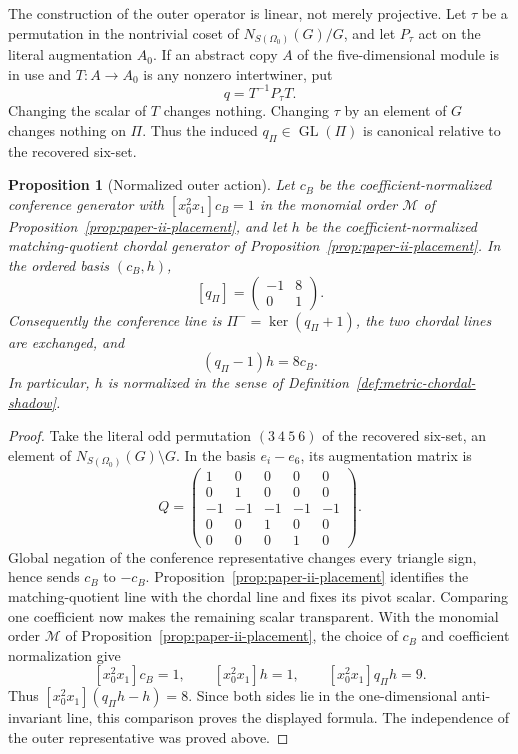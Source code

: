 \documentclass[11pt]{article}
\newtheorem{proposition}[theorem]{Proposition}
\theoremstyle{definition}
\theoremstyle{remark}
\begin{document}
The construction of the outer operator is linear, not merely projective.
Let \(\tau\) be a permutation in the nontrivial coset of
\(N_{S(\Omega_0)}(G)/G\), and let \(P_\tau\) act on the literal augmentation
\(A_0\).  If an abstract copy \(A\) of the five-dimensional module is in use
and \(T:A\to A_0\) is any nonzero intertwiner, put
\[
                         q=T^{-1}P_\tau T.
\]
Changing the scalar of \(T\) changes nothing.  Changing \(\tau\) by an
element of \(G\) changes nothing on \(\Pi\).  Thus the induced
\(q_\Pi\in\operatorname{GL}(\Pi)\) is canonical relative to the recovered
six-set.

\begin{proposition}[Normalized outer action]
\label{prop:outer-pencil-action}
Let \(c_B\) be the coefficient-normalized conference generator with
\([x_0^2x_1]c_B=1\) in the monomial order \(\mathcal M\) of
Proposition~\ref{prop:paper-ii-placement}, and let
\(h\) be the coefficient-normalized matching-quotient chordal generator of
Proposition~\ref{prop:paper-ii-placement}.  In the
ordered basis \((c_B,h)\),
\[
              [q_\Pi]=\begin{pmatrix}-1&8\\0&1\end{pmatrix}.
\]
Consequently the conference line is \(\Pi^-=\ker(q_\Pi+1)\), the two chordal
lines are exchanged, and
\[
          (q_\Pi-1)h=8c_B.
\]
In particular, \(h\) is normalized in the sense of
Definition~\ref{def:metric-chordal-shadow}.
\end{proposition}

\begin{proof}
Take the literal odd permutation \((3\ 4\ 5\ 6)\) of the recovered
six-set, an element of \(N_{S(\Omega_0)}(G)\setminus G\).  In the basis \(e_i-e_6\), its augmentation matrix is
\[
 Q=\begin{pmatrix}
 1&0&0&0&0\\
 0&1&0&0&0\\
 -1&-1&-1&-1&-1\\
 0&0&1&0&0\\
 0&0&0&1&0
 \end{pmatrix}.
\]
Global negation of the conference representative changes every triangle sign, hence sends
\(c_B\) to \(-c_B\).  Proposition~\ref{prop:paper-ii-placement} identifies
the matching-quotient line with the chordal line and fixes its pivot scalar.  Comparing one
coefficient now makes the remaining scalar transparent.  With the monomial
order \(\mathcal M\) of Proposition~\ref{prop:paper-ii-placement}, the choice of \(c_B\) and coefficient
normalization give
\[
 [x_0^2x_1]c_B=1,\qquad [x_0^2x_1]h=1,\qquad
 [x_0^2x_1]q_\Pi h=9.
\]
Thus \([x_0^2x_1](q_\Pi h-h)=8\).  Since both sides lie in the
one-dimensional anti-invariant line, this comparison proves the displayed
formula.  The independence of the outer representative was proved above.
\end{proof}
\end{document}
